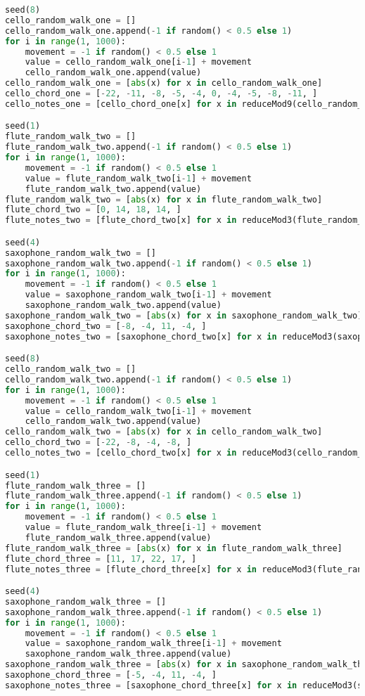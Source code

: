 \begin{lstlisting}[language=Python, caption=Four Ages of Sand Segment\_II]
seed(8)
cello_random_walk_one = []
cello_random_walk_one.append(-1 if random() < 0.5 else 1)
for i in range(1, 1000):
    movement = -1 if random() < 0.5 else 1
    value = cello_random_walk_one[i-1] + movement
    cello_random_walk_one.append(value)
cello_random_walk_one = [abs(x) for x in cello_random_walk_one]
cello_chord_one = [-22, -11, -8, -5, -4, 0, -4, -5, -8, -11, ]
cello_notes_one = [cello_chord_one[x] for x in reduceMod9(cello_random_walk_one)]

seed(1)
flute_random_walk_two = []
flute_random_walk_two.append(-1 if random() < 0.5 else 1)
for i in range(1, 1000):
    movement = -1 if random() < 0.5 else 1
    value = flute_random_walk_two[i-1] + movement
    flute_random_walk_two.append(value)
flute_random_walk_two = [abs(x) for x in flute_random_walk_two]
flute_chord_two = [0, 14, 18, 14, ]
flute_notes_two = [flute_chord_two[x] for x in reduceMod3(flute_random_walk_two)]

seed(4)
saxophone_random_walk_two = []
saxophone_random_walk_two.append(-1 if random() < 0.5 else 1)
for i in range(1, 1000):
    movement = -1 if random() < 0.5 else 1
    value = saxophone_random_walk_two[i-1] + movement
    saxophone_random_walk_two.append(value)
saxophone_random_walk_two = [abs(x) for x in saxophone_random_walk_two]
saxophone_chord_two = [-8, -4, 11, -4, ]
saxophone_notes_two = [saxophone_chord_two[x] for x in reduceMod3(saxophone_random_walk_two)]

seed(8)
cello_random_walk_two = []
cello_random_walk_two.append(-1 if random() < 0.5 else 1)
for i in range(1, 1000):
    movement = -1 if random() < 0.5 else 1
    value = cello_random_walk_two[i-1] + movement
    cello_random_walk_two.append(value)
cello_random_walk_two = [abs(x) for x in cello_random_walk_two]
cello_chord_two = [-22, -8, -4, -8, ]
cello_notes_two = [cello_chord_two[x] for x in reduceMod3(cello_random_walk_two)]

seed(1)
flute_random_walk_three = []
flute_random_walk_three.append(-1 if random() < 0.5 else 1)
for i in range(1, 1000):
    movement = -1 if random() < 0.5 else 1
    value = flute_random_walk_three[i-1] + movement
    flute_random_walk_three.append(value)
flute_random_walk_three = [abs(x) for x in flute_random_walk_three]
flute_chord_three = [11, 17, 22, 17, ]
flute_notes_three = [flute_chord_three[x] for x in reduceMod3(flute_random_walk_three)]

seed(4)
saxophone_random_walk_three = []
saxophone_random_walk_three.append(-1 if random() < 0.5 else 1)
for i in range(1, 1000):
    movement = -1 if random() < 0.5 else 1
    value = saxophone_random_walk_three[i-1] + movement
    saxophone_random_walk_three.append(value)
saxophone_random_walk_three = [abs(x) for x in saxophone_random_walk_three]
saxophone_chord_three = [-5, -4, 11, -4, ]
saxophone_notes_three = [saxophone_chord_three[x] for x in reduceMod3(saxophone_random_walk_three)]


\end{lstlisting}
